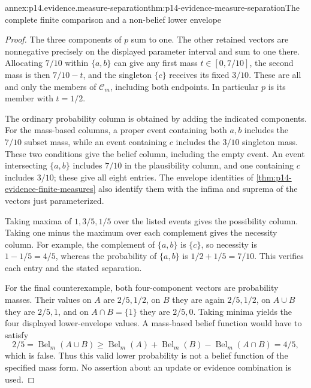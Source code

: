 \begin{annexitem}{annex:p14.evidence.measure-separation}{thm:p14-evidence-measure-separation}{The complete finite comparison and a non-belief lower envelope}
\begin{proof}
The three components of \(p\) sum to one. The other retained vectors
are nonnegative precisely on the displayed parameter interval and sum
to one there. Allocating \(7/10\) within \(\{a,b\}\) can give any
first mass \(t\in[0,7/10]\), the second mass is then \(7/10-t\),
and the singleton \(\{c\}\) receives its fixed \(3/10\).
These are all and only the members of \(\mathcal C_m\), including both
endpoints. In particular \(p\) is its member with \(t=1/2\).

The ordinary probability column is obtained by adding the indicated
components. For the mass-based columns, a proper event containing both
\(a,b\) includes the \(7/10\) subset mass, while an event containing
\(c\) includes the \(3/10\) singleton mass. These two conditions give
the belief column, including the empty event. An event intersecting
\(\{a,b\}\) includes \(7/10\) in the plausibility column, and one
containing \(c\) includes \(3/10\); these give all eight entries.
The envelope identities of \cref{thm:p14-evidence-finite-measures} also
identify them with the infima and suprema of the vectors just parameterized.

Taking maxima of \(1,3/5,1/5\) over the listed events gives the
possibility column. Taking one minus the maximum over each complement
gives the necessity column. For example, the complement of \(\{a,b\}\)
is \(\{c\}\), so necessity is \(1-1/5=4/5\), whereas the
probability of \(\{a,b\}\) is \(1/2+1/5=7/10\). This verifies
each entry and the stated separation.

For the final counterexample, both four-component vectors are probability
masses. Their values on \(A\) are \(2/5,1/2\), on \(B\) they are
again \(2/5,1/2\), on \(A\cup B\) they are \(2/5,1\), and on
\(A\cap B=\{1\}\) they are \(2/5,0\). Taking minima yields the
four displayed lower-envelope values. A mass-based belief function would
have to satisfy
\[
 2/5=\operatorname{Bel}_m(A\cup B)
 \geq\operatorname{Bel}_m(A)+\operatorname{Bel}_m(B)
       -\operatorname{Bel}_m(A\cap B)=4/5,
\]
which is false. Thus this valid lower probability is not a belief function
of the specified mass form. No assertion about an update or evidence
combination is used.
\end{proof}
\end{annexitem}
